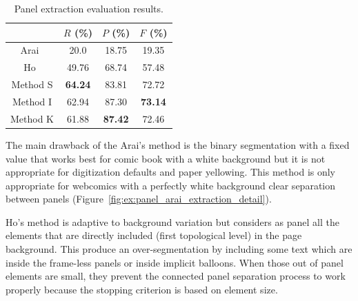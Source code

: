   \begin{table}[ht]
    \normalsize

    \centering
    \caption[Panel extraction evaluation results]{Panel extraction evaluation results.}
    \begin{tabular}{|c|c|c|c|}
          \hline
          &  $R$ (\%)  & $P$ (\%)  & $F$ (\%)     \\
          \hline
          Arai~\cite{Arai11}   & 20.0       & 18.75    & 19.35    \\
          \hline
          Ho~\cite{Ho2012}   & 49.76       & 68.74    & 57.48    \\
          \hline
          Method S          & \textbf{64.24}       & 83.81   & 72.72     \\
          \hline
          Method I          & 62.94       & 87.30   & \bf{73.14}      \\
          \hline
          Method K          & 61.88       & \textbf{87.42}     & 72.46      \\
          \hline
        \end{tabular}
    \label{tab:panel_extraction_comparision_results}
  \end{table}%


The main drawback of the Arai's method is the binary segmentation with a fixed value that works best for comic book with a white background but it is not appropriate for digitization defaults and paper yellowing.
This method is only appropriate for webcomics with a perfectly white background clear separation between panels (Figure~\ref{fig:ex:panel_arai_extraction_detail}).

Ho's method is adaptive to background variation but considers as panel all the elements that are directly included (first topological level) in the page background.
This produce an over-segmentation by including some text which are inside the frame-less panels or inside implicit balloons.
When those out of panel elements are small, they prevent the connected panel separation process to work properly because the stopping criterion is based on element size.

